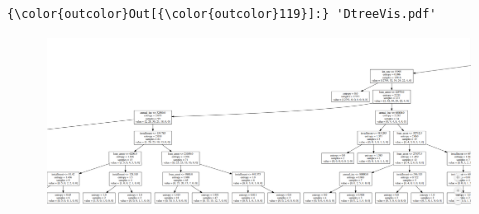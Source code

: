 \documentclass[11pt]{article}
\makeatletter
\def\maxwidth{\ifdim\Gin@nat@width>\linewidth\linewidth
    \else\Gin@nat@width\fi}
\let\Oldincludegraphics\includegraphics
\renewcommand{\includegraphics}[1]{\Oldincludegraphics[width=.8\maxwidth]{#1}}
\makeatother
\begin{document}
\begin{Verbatim}[commandchars=\\\{\}]
{\color{outcolor}Out[{\color{outcolor}119}]:} 'DtreeVis.pdf'
\end{Verbatim}
            
    \begin{figure}[H]
\centering
\includegraphics{34.png}
\caption{}
\end{figure}


    
    
    
    
\end{document}
